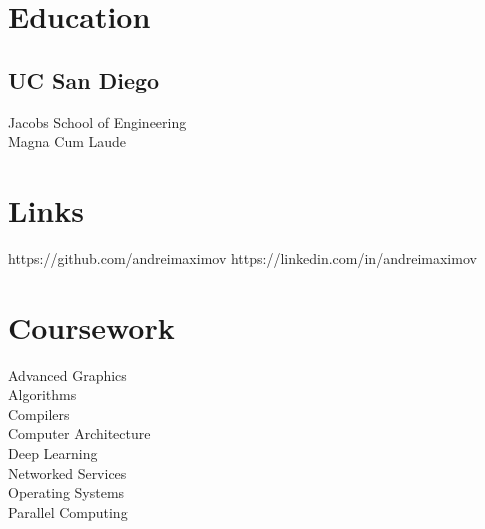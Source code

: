 \documentclass[]{resume}
\begin{document}
%
%
\lastupdated

%
%




%
%

\begin{minipage}[t]{0.33\textwidth}


\section{Education}

\subsection{UC San Diego}
Jacobs School of Engineering \\
Magna Cum Laude \\
\sectionsep


\section{Links}
https://github.com/andreimaximov
https://linkedin.com/in/andreimaximov
\sectionsep


\section{Coursework}

Advanced Graphics \\
Algorithms \\
Compilers \\
Computer Architecture \\
Deep Learning \\
Networked Services \\
Operating Systems \\
Parallel Computing


\end{minipage}
\end{document}
